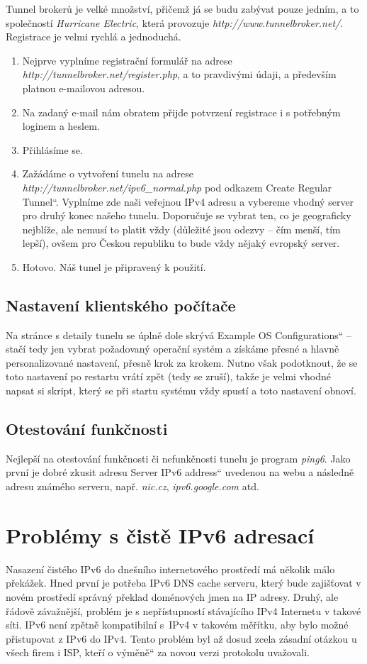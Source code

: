 \documentclass[12pt]{report}
\newcommand\uv[1]{\quotedblbase #1\textquotedblleft}
\begin{document}
Tunnel brokerů je velké množství, přičemž já se budu zabývat pouze jedním, a to společností \textit{Hurricane Electric}, která provozuje \textit{http://www.tunnelbroker.net/}. Registrace je velmi rychlá a jednoduchá.

\begin{enumerate}
\item Nejprve vyplníme registrační formulář na adrese \textit{http://tunnelbroker.net/register.php}, a to pravdivými údaji, a především platnou e-mailovou adresou.
\item Na zadaný e-mail nám obratem přijde potvrzení registrace i s potřebným loginem a heslem.
\item Přihlásíme se.
\item Zažádáme o vytvoření tunelu na adrese \textit{http://tunnelbroker.net/ipv6\_normal.php} pod odkazem \uv{Create Regular Tunnel}. Vyplníme zde naši veřejnou IPv4 adresu a vybereme vhodný server pro druhý konec našeho tunelu. Doporučuje se vybrat ten, co je geograficky nejblíže, ale nemusí to platit vždy (důležité jsou odezvy -- čím menší, tím lepší), ovšem pro Českou republiku to bude vždy nějaký evropský server.
\item Hotovo. Náš tunel je připravený k použití.
\end{enumerate}

\subsection{Nastavení klientského počítače}
Na stránce s detaily tunelu se úplně dole skrývá \uv{Example OS Configurations} -- stačí tedy jen vybrat požadovaný operační systém a získáme přesné a hlavně personalizované nastavení, přesně krok za krokem. Nutno však podotknout, že se toto nastavení po restartu vrátí zpět (tedy se zruší), takže je velmi vhodné napsat si skript, který se při startu systému vždy spustí a toto nastavení obnoví.

\subsection{Otestování funkčnosti}
Nejlepší na otestování funkčnosti či nefunkčnosti tunelu je program \textit{ping6}. Jako první je dobré zkusit adresu \uv{Server IPv6 address} uvedenou na webu a následně adresu známého serveru, např. \textit{nic.cz}, \textit{ipv6.google.com} atd.

\section{Problémy s čistě IPv6 adresací}
Nasazení čistého IPv6 do dnešního internetového prostředí má několik málo překážek. Hned první je potřeba IPv6 DNS cache serveru, který bude zajišťovat v novém prostředí správný překlad doménových jmen na IP adresy. Druhý, ale řádově závažnější, problém je s nepřístupností stávajícího IPv4 Internetu v takové síti. IPv6 není zpětně kompatibilní s~IPv4 v takovém měřítku, aby bylo možné přistupovat z IPv6 do IPv4. Tento problém byl až dosud zcela zásadní otázkou u všech firem i ISP, kteří o \uv{výměně} za novou verzi protokolu uvažovali.
\end{document}
